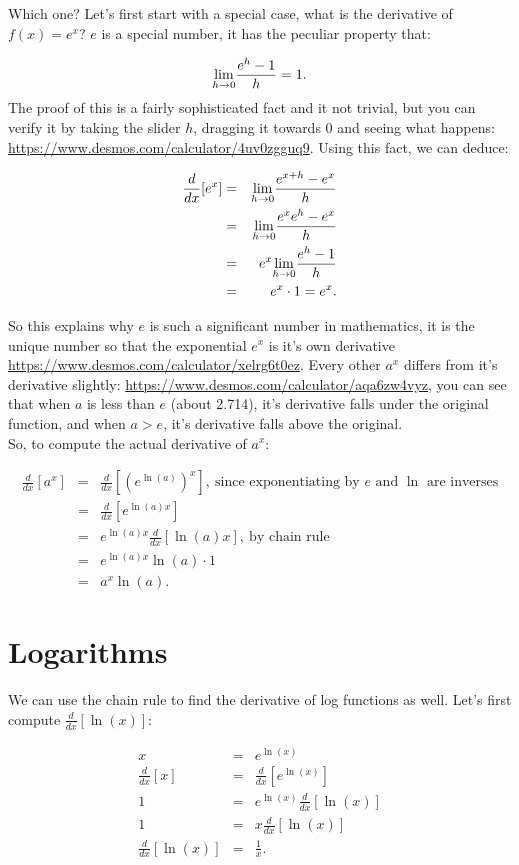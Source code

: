 Which one?  Let's first start with a special case, what is the derivative of $f(x)=e^x$?  $e$ is a special number, it has the peculiar property that:

$$\displaystyle{ \lim_{h \to 0}}\frac{e^h-1}{h}=1.$$  The proof of this is a fairly sophisticated fact and it not trivial, but you can verify it by taking the slider $h$, dragging it towards 0 and seeing what happens: \url{https://www.desmos.com/calculator/4uv0zgguq9}.  Using this fact, we can deduce:

\begin{eqnarray*}
\frac{d}{dx}[e^x]&=&\displaystyle{ \lim_{h \to 0}}\frac{e^{x+h}-e^x}{h}\\
&=&\displaystyle{ \lim_{h \to 0}}\frac{e^xe^h-e^x}{h}\\
&=&e^x\displaystyle{ \lim_{h \to 0}}\frac{e^h-1}{h}\\
&=&e^x\cdot1=e^x.
\end{eqnarray*}


So this explains why $e$ is such a significant number in mathematics, it is the unique number so that the exponential $e^x$ is it's own derivative \url{https://www.desmos.com/calculator/xelrg6t0ez}.   Every other $a^x$ differs from it's derivative slightly: \url{https://www.desmos.com/calculator/aqa6zw4vyz}, you can see that when $a$ is less than $e$ (about 2.714), it's derivative falls under the original function, and when $a>e$, it's derivative falls above the original.\\

So, to compute the actual derivative of $a^x$:

\begin{eqnarray*}
\frac{d}{dx}[a^x]&=&\frac{d}{dx}[(e^{\ln(a)})^x],\ \text{since exponentiating by $e$ and $\ln$ are inverses}\\
&=&\frac{d}{dx}[e^{\ln(a)x}]\\
&=&e^{\ln(a)x}\frac{d}{dx}[\ln(a)x],\ \text{by chain rule}\\
&=&e^{\ln(a)x}\ln(a)\cdot1\\
&=&a^x\ln(a).
\end{eqnarray*}


\section{Logarithms}\label{DerivativeLogs}

We can use the chain rule to find the derivative of log functions as well.  Let's first compute $\frac{d}{dx}[\ln(x)]$:

\begin{eqnarray*}
x&=&e^{\ln(x)}\\
\frac{d}{dx}[x]&=&\frac{d}{dx}[e^{\ln(x)}]\\
1&=&e^{\ln(x)}\frac{d}{dx}[\ln(x)]\\
1&=&x\frac{d}{dx}[\ln(x)]\\
\frac{d}{dx}[\ln(x)]&=&\frac{1}{x}.
\end{eqnarray*}

